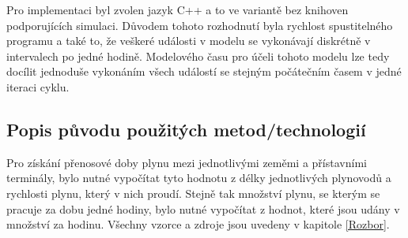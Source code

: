 \documentclass[a4paper,11pt]{article}
\begin{document}

Pro implementaci byl zvolen jazyk C++ a to ve variantě bez knihoven podporujících simulaci.
Důvodem tohoto rozhodnutí byla rychlost spustitelného programu a také to,
že veškeré události v modelu se vykonávají diskrétně v intervalech po jedné hodině.
Modelového času \cite[str,21]{IMS} pro účeli tohoto modelu lze tedy docílit
jednoduše vykonáním všech
událostí se stejným počátečním časem v jedné iteraci cyklu.

\subsection{Popis původu použitých metod/technologií}


Pro získání přenosové doby plynu mezi jednotlivými zeměmi a přístavními terminály,
bylo nutné vypočítat tyto hodnotu z délky jednotlivých plynovodů a rychlosti plynu,
který v nich proudí.
Stejně tak množství plynu, se kterým se pracuje za dobu jedné hodiny,
bylo nutné vypočítat z hodnot, které jsou udány v množství za hodinu.
Všechny vzorce a zdroje jsou uvedeny v kapitole \ref{Rozbor}. 
\end{document}
